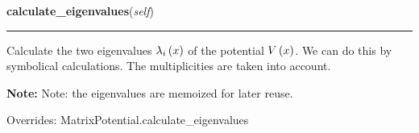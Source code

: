\hspace{.8\funcindent}\begin{boxedminipage}{\funcwidth}

    \raggedright \textbf{calculate\_eigenvalues}(\textit{self})

    \vspace{-1.5ex}

    \rule{\textwidth}{0.5\fboxrule}
\setlength{\parskip}{2ex}
    Calculate the two eigenvalues
    $\lambda_i\left( x \right)$ of the potential
    $V\left( x \right)$. We can do this by symbolical
    calculations. The multiplicities are taken into account.

\setlength{\parskip}{1ex}
\textbf{Note:} Note: the eigenvalues are memoized for later reuse.


      Overrides: MatrixPotential.calculate\_eigenvalues




    \end{boxedminipage}

    \vspace{0.5ex}

